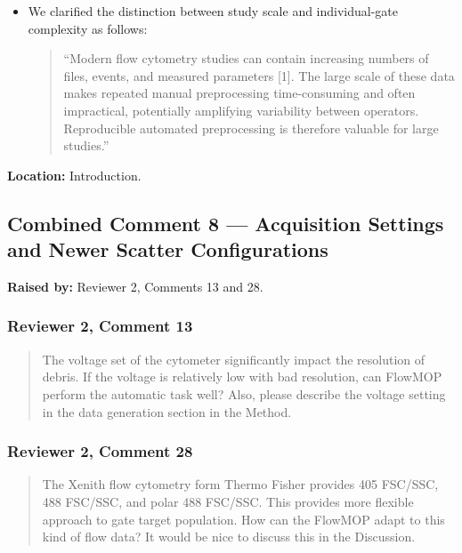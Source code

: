 \documentclass[
  11pt,
  a4paper,
]{article}
\begin{document}
\begin{itemize}
\item
  We clarified the distinction between study scale and individual-gate
  complexity as follows:

  \begin{quote}
  ``Modern flow cytometry studies can contain increasing numbers of
  files, events, and measured parameters {[}1{]}. The large scale of
  these data makes repeated manual preprocessing time-consuming and
  often impractical, potentially amplifying variability between
  operators. Reproducible automated preprocessing is therefore valuable
  for large studies.''
  \end{quote}
\end{itemize}

\textbf{Location:} Introduction.

\subsection{Combined Comment 8 --- Acquisition Settings and Newer
Scatter
Configurations}\label{combined-comment-8--acquisition-settings-and-newer-scatter-configurations}

\textbf{Raised by:} Reviewer 2, Comments 13 and 28.

\subsubsection{Reviewer 2, Comment 13}\label{reviewer-2-comment-13}

\begin{quote}
The voltage set of the cytometer significantly impact the resolution of
debris. If the voltage is relatively low with bad resolution, can
FlowMOP perform the automatic task well? Also, please describe the
voltage setting in the data generation section in the Method.
\end{quote}

\subsubsection{Reviewer 2, Comment 28}\label{reviewer-2-comment-28}

\begin{quote}
The Xenith flow cytometry form Thermo Fisher provides 405 FSC/SSC, 488
FSC/SSC, and polar 488 FSC/SSC. This provides more flexible approach to
gate target population. How can the FlowMOP adapt to this kind of flow
data? It would be nice to discuss this in the Discussion.
\end{quote}
\end{document}
